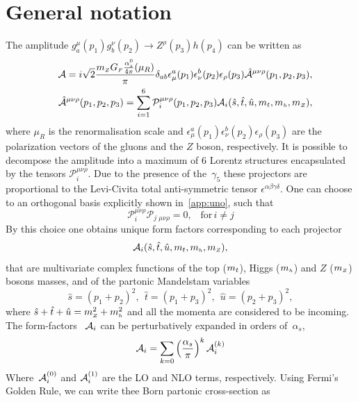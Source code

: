 \section{General notation \label{chap6sec:GenNot} }
\par The amplitude  $g^\mu_a(p_1)g^\nu_b(p_2)\to Z^\rho(p_3) h(p_4)$ can be written as
\begin{align}
&&{\cal A}=i \sqrt{2}\frac{m_{ \scriptscriptstyle Z} G_{ \scriptscriptstyle F} \frac{\alpha_s^0}{4 \pi}(\mu_R)}{\pi}\delta_{ab}\epsilon^a_\mu(p_1)
\epsilon^b_\nu(p_2)\epsilon_\rho(p_3)\hat{{\cal A}}^{\mu\nu\rho}(p_1,p_2,p_3 ),\\
&&\hat{{\cal A}}^{\mu\nu\rho}(p_1,p_2,p_3 )=\sum_{i=1}^{6}
\mathcal{P}_i^{\mu\nu\rho}(p_1,p_2,p_3 )
{\cal A}_i(\hat{s},\hat{t},\hat{u},m_t,m_{ \scriptscriptstyle h},m_{ \scriptscriptstyle Z}),
\label{eq:amp}
\end{align}
where  $\mu_R$ is the renormalisation scale and
$\epsilon^a_\mu(p_1)\epsilon^b_\nu(p_2)\epsilon_\rho(p_3)$ are the
polarization vectors of the gluons and the $Z$ boson, respectively.  It is possible to decompose the amplitude into a maximum of $6$ Lorentz structures encapsulated by the 
tensors $\mathcal{P}_i^{\mu\nu\rho}$. Due to the presence of the~$\gamma_5$ these projectors are
proportional to the Levi-Civita total anti-symmetric tensor
$\epsilon^{\alpha\beta\gamma\delta}$. One can choose to an orthogonal basis explicitly shown in~\autoref{app:uno}, such that
\begin{equation}
	\mathcal{P}_i^{\mu\nu\rho} \mathcal{P}_j\,_{\mu\nu\rho} = 0, \,\,\, \,\, \text{for}\, i \neq j 
\end{equation}
By this choice one obtains unique form factors corresponding to each projector
\begin{equation}
{\cal A}_i(\hat{s},\hat{t},\hat{u},m_t,m_{ \scriptscriptstyle h},m_{ \scriptscriptstyle Z}),
\end{equation}
 that are multivariate complex functions of the
top ($m_t$), Higgs ($m_{ \scriptscriptstyle h}$) and $Z$ ($m_{ \scriptscriptstyle Z}$) bosons masses, and of
the partonic Mandelstam variables
\begin{equation}
\hat{s}=(p_1+p_2)^2,~~ \hat{t}=(p_1+p_3)^2,~~ \hat{u}=(p_2+p_3)^2,
\end{equation}
where $\hat{s}+\hat{t}+\hat{u}=m_{ \scriptscriptstyle Z}^2+m_{ \scriptscriptstyle h}^2$ and all the momenta are considered to
be incoming. 
The form-factors~ ${\cal A}_i$ can be perturbatively expanded in orders of~$\alpha_s$, 
\begin{equation}
{\cal A}_{i} = \sum_{k=0} \left(\frac{\alpha_s}{\pi} \right) ^k {\cal A}_i^{(k)}
\label{eq:ampexp}
\end{equation}
Where~${\cal A}_i^{(0)}$ and ${\cal A}_i^{(1)}$ are the LO and NLO terms, respectively. Using Fermi's Golden Rule, we can write thee Born partonic cross-section as
